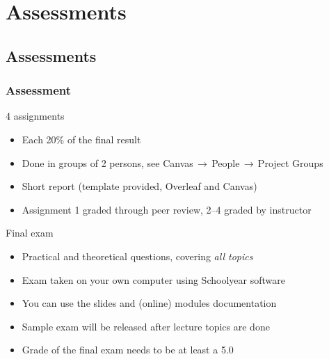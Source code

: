 \section{Assessments}
\subsection{Assessments}
{\nologo
\begin{frame}
 \frametitle{Assessment}
 \begin{block}{4 assignments}
  \begin{itemize}
    \item Each 20\% of the final result
    \item Done in groups of 2 persons, see Canvas$\,\to\,$People$\,\to\,$Project Groups
    \item Short report (template provided, Overleaf and Canvas)
    \item Assignment 1 graded through peer review, 2--4 graded by instructor
    \end{itemize}   
 \end{block}
 \pause
 \begin{block}{Final exam}
  \begin{itemize}
    \item Practical and theoretical questions, covering \emph{all topics}
    \item Exam taken on your own computer using Schoolyear software
    \item You can use the slides and (online) modules documentation
    \item Sample exam will be released after lecture topics are done
    \item Grade of the final exam needs to be at least a 5.0
  \end{itemize}   
 \end{block}
\end{frame}
}

